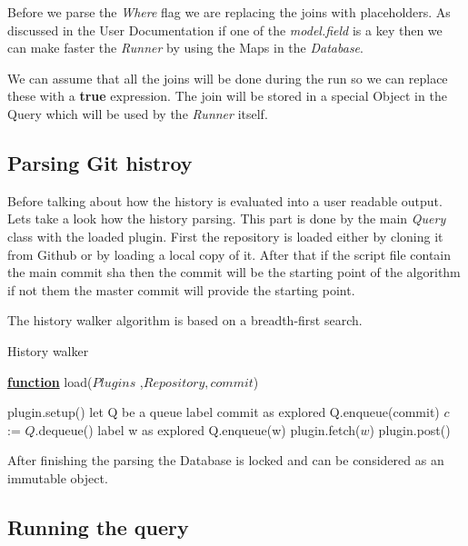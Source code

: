 Before we parse the \textit{Where} flag we are replacing the joins with placeholders.
As discussed in the User Documentation if one of the \textit{model.field} is a key then
we can make faster the \textit{Runner} by using the Maps in the \textit{Database}.

We can assume that all the joins will be done during the run so we can replace these with a
\textbf{true} expression. The join will be stored in a special Object in the Query which will
be used by the \textit{Runner} itself.

\subsection{Parsing Git histroy}

Before talking about how the history is evaluated into a user readable output. Lets take a look
how the history parsing. This part is done by the main \textit{Query} class with the loaded
plugin. First the repository is loaded either by cloning it from Github or by loading a local copy of it. After that if the script file contain the main commit sha then the commit will be the starting point of the algorithm if not them the master commit will provide the starting point.

The history walker algorithm is based on a breadth-first search.

\begin{algorithm}[H]
	\caption{History walker} 
	\label{alg:ibb} 
	\textbf{\underline{function}} load($Plugins$ ,$Repository, commit$)
	\begin{algorithmic}[1] %
		\State plugin.setup()
		\EndFor
		\State let Q be a queue
		\State label commit as explored
		\State Q.enqueue(commit)
		\State $c$ := $Q$.dequeue()
		\State label w as explored  
		\State Q.enqueue(w) 
		\State plugin.fetch($w$)
		\EndFor 
		\EndIf
		\EndFor
		\EndWhile
		\State plugin.post()
		\EndFor
		\end{algorithmic}
\end{algorithm}

After finishing the parsing the Database is locked and can be considered as an immutable object. 

\subsection{Running the query}

